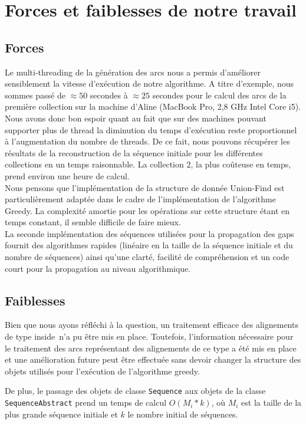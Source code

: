 
\section{Forces et faiblesses de notre travail}

\subsection{Forces}

Le multi-threading de la génération des arcs nous a permis d'améliorer sensiblement la vitesse d'exécution de notre algorithme. A titre d'exemple, nous sommes passé de $\approx 50$ secondes à $\approx 25$ secondes pour le calcul des arcs de la première collection sur la machine d'Aline (MacBook Pro, 2,8 GHz Intel Core i5). Nous avons donc bon espoir quant au fait que sur des machines pouvant supporter plus de thread la diminution du temps d'exécution reste proportionnel à l'augmentation du nombre de threads. De ce fait, nous pouvons récupérer les résultats de la reconstruction de la séquence initiale pour les différentes collections en un temps raisonnable. La collection 2, la plus coûteuse en temps, prend environ une heure de calcul.\\

Nous pensons que l'implémentation de la structure de donnée Union-Find est particulièrement adaptée dans le cadre de l'implémentation de l'algorithme Greedy. La complexité amortie pour les opérations sur cette structure étant en temps constant, il semble difficile de faire mieux.\\


La seconde implémentation des séquences utilisées pour la propagation des gaps
fournit des algorithmes rapides (linéaire en la taille de la séquence initiale et
du nombre de séquences) ainsi qu'une clarté, facilité de compréhension et un
code court pour la propagation au niveau algorithmique.


\subsection{Faiblesses}

Bien que nous ayons réfléchi à la question, un traitement efficace des alignements de type \og inside\fg~n'a pu être mis en place. Toutefois, l'information nécessaire pour le traitement des arcs représentant des alignements de ce type a été mis en place et une amélioration future peut être effectuée sans devoir changer la structure des objets utilisés pour l'exécution de l'algorithme greedy.

De plus, le passage des objets de classe \verb|Sequence| aux objets de la classe
\verb|SequenceAbstract| prend un temps de calcul $O(M_{i} * k)$, où $M_{i}$ est
la taille de la plus grande séquence initiale et $k$ le nombre initial de
séquences.

